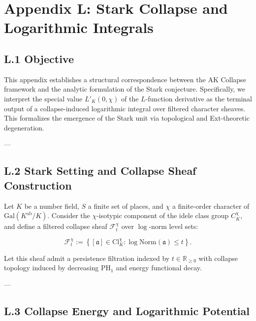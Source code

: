 \documentclass[11pt]{article}
\begin{document}

\section*{Appendix L: Stark Collapse and Logarithmic Integrals}

\subsection*{L.1 Objective}

This appendix establishes a structural correspondence between the AK Collapse framework and the analytic formulation of the Stark conjecture. Specifically, we interpret the special value $L'_K(0, \chi)$ of the $L$-function derivative as the terminal output of a collapse-induced logarithmic integral over filtered character sheaves. This formalizes the emergence of the Stark unit via topological and Ext-theoretic degeneration.

---

\subsection*{L.2 Stark Setting and Collapse Sheaf Construction}

Let $K$ be a number field, $S$ a finite set of places, and $\chi$ a finite-order character of $\mathrm{Gal}(K^{\text{ab}}/K)$. Consider the $\chi$-isotypic component of the idele class group $C_K^\chi$, and define a filtered collapse sheaf $\mathcal{F}^\chi_t$ over $\log$-norm level sets:

\[
\mathcal{F}^\chi_t := \left\{ [\mathfrak{a}] \in \mathrm{Cl}_K^\chi : \log \mathrm{Norm}(\mathfrak{a}) \leq t \right\}.
\]

Let this sheaf admit a persistence filtration indexed by $t \in \mathbb{R}_{\geq 0}$ with collapse topology induced by decreasing $\mathrm{PH}_1$ and energy functional decay.

---

\subsection*{L.3 Collapse Energy and Logarithmic Potential}
\end{document}
